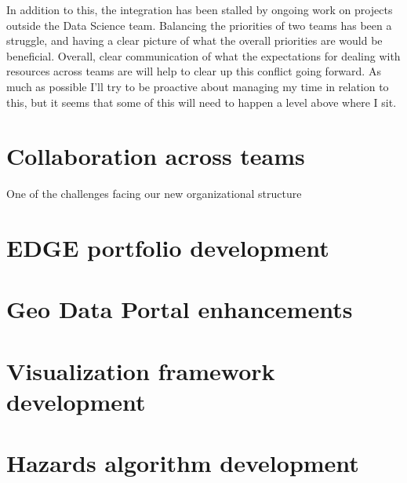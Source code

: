 \documentclass{article}
\begin{document}
In addition to this, the integration has been stalled by ongoing work on projects outside the Data Science team.
Balancing the priorities of two teams has been a struggle, and having a clear picture of what the overall priorities are would be beneficial.
Overall, clear communication of what the expectations for dealing with resources across teams are will help to clear up this conflict going forward.
As much as possible I'll try to be proactive about managing my time in relation to this, but it seems that some of this will need to happen a level above where I sit.

\section{Collaboration across teams}

One of the challenges facing our new organizational structure 

\section{EDGE portfolio development}


\section{Geo Data Portal enhancements}


\section{Visualization framework development}


\section{Hazards algorithm development}
\end{document}
